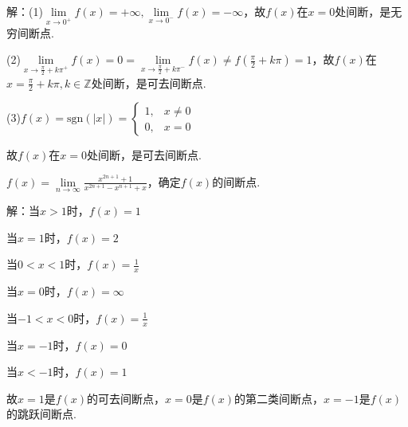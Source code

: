 \documentclass[12pt,UTF8]{ctexart}
\begin{document}
\begin{enumerate}
解：(1)$\lim\limits_{x\rightarrow0^+}f(x)=+\infty,\lim\limits_{x\rightarrow0^-}f(x)=-\infty$，故$f(x)$在$x=0$处间断，是无穷间断点.

(2)$\lim\limits_{x\rightarrow\frac\pi2+k\pi^+}f(x)=0=\lim\limits_{x\rightarrow\frac\pi2+k\pi^-}f(x)\neq f(\frac\pi2+k\pi)=1$，故$f(x)$在$x=\frac\pi2+k\pi,k\in\mathbb Z$处间断，是可去间断点.

(3)$f(x)=\text{sgn}(|x|)=\begin{cases}
1,&x\neq0\\
0,&x=0
\end{cases}$

故$f(x)$在$x=0$处间断，是可去间断点.

$f(x)=\lim\limits_{n\rightarrow\infty}\frac{x^{2n+1}+1}{x^{2n+1}-x^{n+1}+x}$，确定$f(x)$的间断点.

解：当$x>1$时，$f(x)=1$

当$x=1$时，$f(x)=2$

当$0<x<1$时，$f(x)=\frac1x$

当$x=0$时，$f(x)=\infty$

当$-1<x<0$时，$f(x)=\frac1x$

当$x=-1$时，$f(x)=0$

当$x<-1$时，$f(x)=1$

故$x=1$是$f(x)$的可去间断点，$x=0$是$f(x)$的第二类间断点，$x=-1$是$f(x)$的跳跃间断点.
\end{enumerate}
\end{document}
